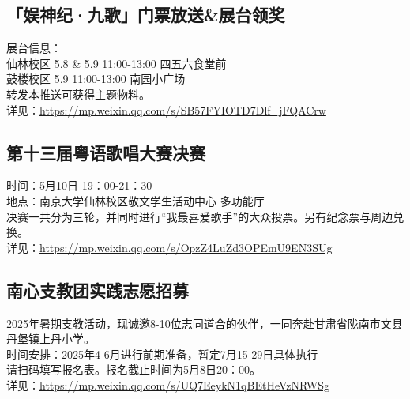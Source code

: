\documentclass[letterpaper, 12pt]{article}
\begin{document}
\begin{multicols}{2}
\subsection{ 「娱神纪·九歌」门票放送\&展台领奖} %
展台信息：
\\仙林校区 5.8 \& 5.9 11:00-13:00 四五六食堂前
\\鼓楼校区 5.9 11:00-13:00 南园小广场
\\转发本推送可获得主题物料。
\\详见：\url{https://mp.weixin.qq.com/s/SB57FYIOTD7Dlf_jFQACrw}

\subsection{ 第十三届粤语歌唱大赛决赛} %
时间：5月10日 19：00-21：30
\\地点：南京大学仙林校区敬文学生活动中心 多功能厅
\\决赛一共分为三轮，并同时进行“我最喜爱歌手”的大众投票。另有纪念票与周边兑换。
\\详见：\url{https://mp.weixin.qq.com/s/OpzZ4LuZd3OPEmU9EN3SUg}

\subsection{南心支教团实践志愿招募} %
2025年暑期支教活动，现诚邀8-10位志同道合的伙伴，一同奔赴甘肃省陇南市文县丹堡镇上丹小学。
\\时间安排：2025年4-6月进行前期准备，暂定7月15-29日具体执行
\\请扫码填写报名表。报名截止时间为5月8日20：00。
\\详见：\url{https://mp.weixin.qq.com/s/UQ7EeykN1qBEtHeVzNRWSg}

\end{multicols}
\end{document}
